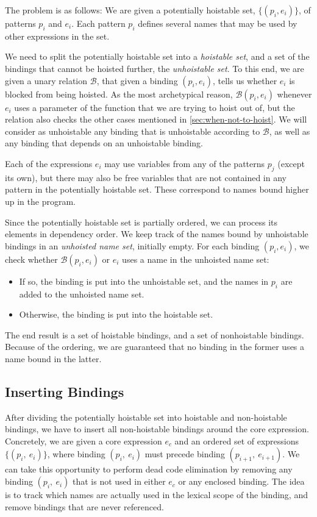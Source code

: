The problem is as follows: We are given a potentially hoistable set,
$\{(p_{i}, e_{i})\}$, of patterns $p_{i}$ and $e_{i}$.  Each pattern
$p_{i}$ defines several names that may be used by other expressions in
the set.

We need to split the potentially hoistable set into a
\textit{hoistable set}, and a set of the bindings that cannot be
hoisted further, the \textit{unhoistable set}.  To this end, we are
given a unary relation $\mathcal{B}$, that given a binding $(p_{i},
e_{i})$, tells us whether $e_{i}$ is blocked from being hoisted.  As
the most archetypical reason, $\mathcal{B}(p_{i}, e_{i})$ whenever
$e_{i}$ uses a parameter of the function that we are trying to hoist
out of, but the relation also checks the other cases mentioned in
\cref{sec:when-not-to-hoist}.  We will consider as unhoistable any
binding that is unhoistable according to $\mathcal{B}$, as well as any
binding that depends on an unhoistable binding.

Each of the expressions $e_{i}$ may use variables from any of the
patterns $p_{j}$ (except its own), but there may also be free
variables that are not contained in any pattern in the potentially
hoistable set.  These correspond to names bound higher up in the
program.

Since the potentially hoistable set is partially ordered, we can
process its elements in dependency order.  We keep track of the names
bound by unhoistable bindings in an \textit{unhoisted name set},
initially empty.  For each binding $(p_{i},e_{i})$, we check whether
$\mathcal{B}(p_{i},e_{i})$ or $e_{i}$ uses a name in the unhoisted
name set:
\begin{itemize}
\item If so, the binding is put into the unhoistable set, and the
  names in $p_{i}$ are added to the unhoisted name set.
\item Otherwise, the binding is put into the hoistable set.
\end{itemize}
The end result is a set of hoistable bindings, and a set of
nonhoistable bindings.  Because of the ordering, we are guaranteed
that no binding in the former uses a name bound in the
latter.

\subsection{Inserting Bindings}

After dividing the potentially hoistable set into hoistable and
non-hoistable bindings, we have to insert all non-hoistable bindings
around the core expression.  Concretely, we are given a core
expression $e_{c}$ and an ordered set of expressions
$\{(p_{i},~e_{i})\}$, where binding $(p_{i},~e_{i})$ must precede
binding $(p_{i+1},~e_{i+1})$.  We can take this opportunity to perform
dead code elimination by removing any binding $(p_{i},~e_{i})$ that is
not used in either $e_{c}$ or any enclosed binding.  The idea is to
track which names are actually used in the lexical scope of the
binding, and remove bindings that are never referenced.

